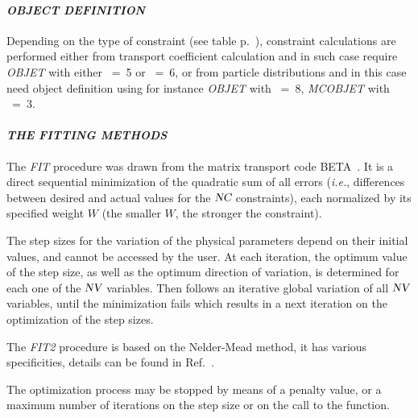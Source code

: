 \paragraph{\textit{OBJECT DEFINITION}}


\noindent Depending on the type of constraint (see table p.~\pageref{TabFITZlst1}), constraint calculations are performed either from 
transport coefficient calculation and in such case require  \textsl{OBJET} with either \KOBJ~=~5  
or  \KOBJ~=~6, or from particle distributions and in this case need  object definition using for 
instance \textsl{OBJET} with \KOBJ~=~8,    \textsl{MCOBJET} with  \KOBJ~=~3. 



\smallskip

\paragraph{\textit{THE FITTING METHODS }}    %


\noindent The   \textsl{FIT} procedure was drawn from  the matrix transport code BETA~\cite{Biblio10}. 
 It is a direct sequential minimization of the quadratic
sum of all errors (\emph{i.e.}, differences between desired and actual values for the $\textsl{NC}$ 
constraints), each normalized by its specified weight $ W $ (the smaller $ W$,
the stronger the constraint). 

\noindent The step sizes for the variation of the physical parameters depend
on their initial  values, and cannot be accessed by the user. At each iteration, the 
optimum value of the step size, as well as the optimum direction of variation,
is determined for each one of the $\textsl{NV}$ variables. Then follows an iterative
global variation of all $\textsl{NV}$ variables, until the minimization fails which results in a
next iteration on the optimization of the step sizes. 

\medskip

\noindent The \textsl{FIT2} procedure is based on the  Nelder-Mead method, it has various specificities, 
details can be found in Ref.~\cite{NelderMead}.


\medskip

\noindent  The optimization process may be stopped by means of a penalty value, or a maximum number of 
iterations on the step size or on the call to the function. 




